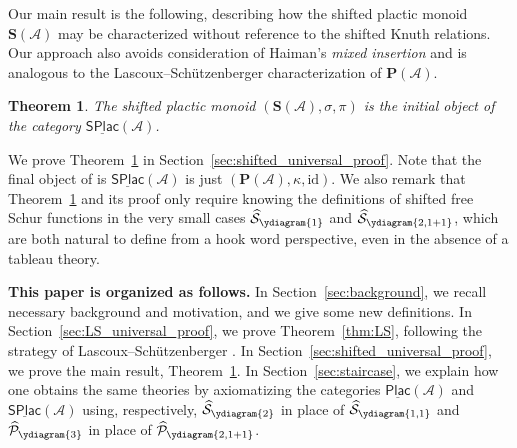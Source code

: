 \documentclass[12 pt]{amsart}
\newcommand{\Plactic}{{\mathbf{P}}}
\newcommand{\sPlactic}{\mathbf{S}}
\newcommand{\Category}{\underline{\mathsf{SPlac}}}
\newcommand{\LSCategory}{\underline{\mathsf{Plac}}}
\newcommand{\FreeSchur}{\widehat{\mathcal{S}}}
\newcommand{\sFreeSchur}{\widehat{\mathcal{P}}}
\newcommand{\cA}{\mathcal{A}}
\newcommand{\id}{\mathrm{id}}
\newtheorem{theorem}[thm]{Theorem}
\theoremstyle{remark}
\numberwithin{equation}{section}
\newcommand{\santiago}[1]{\todo[size=\tiny,color=blue!30]{#1 \\ \hfill --- Santiago}}
\begin{document}
Our main result is the following, describing how the shifted plactic monoid $\sPlactic(\cA)$ may be characterized without reference to the shifted Knuth relations. Our approach also avoids consideration of Haiman's \emph{mixed insertion} and is analogous to the Lascoux--Sch\"utzenberger characterization of $\Plactic(\cA)$. 
\begin{theorem}\label{thm:main}
The shifted plactic monoid $(\sPlactic(\cA), \sigma, \pi)$ is the initial object of the category $\Category(\cA)$.
\end{theorem}


We prove Theorem~\ref{thm:main} in Section~\ref{sec:shifted_universal_proof}.  
Note that the final object of is $\Category(\cA)$ is just $(\Plactic(\cA),\kappa, \id)$. We also remark that Theorem~\ref{thm:main} and its proof only require knowing the definitions of shifted free Schur functions in the very small cases $\FreeSchur_{\ydiagram{1}}$ and $\FreeSchur_{\ydiagram{2,1+1}}$, which are both natural to define from a hook word perspective, even in the absence of a tableau theory.

\bigskip
{\bf This paper is organized as follows.} In Section~\ref{sec:background}, we recall necessary background and motivation, and we give some new definitions. In Section~\ref{sec:LS_universal_proof}, we prove Theorem~\ref{thm:LS}, following the strategy of Lascoux--Sch\"utzenberger \cite{Lascoux.Schutzenberger:plaxique}. In Section~\ref{sec:shifted_universal_proof}, we prove the main result, Theorem~\ref{thm:main}. In Section~\ref{sec:staircase}, we explain how one obtains the same theories by axiomatizing the categories $\LSCategory(\cA)$ and $\Category(\cA)$ using, respectively,
 $\FreeSchur_{\ydiagram{2}}$ in place of $\FreeSchur_{\ydiagram{1,1}}$ and $\sFreeSchur_{\ydiagram{3}}$ in place of $\sFreeSchur_{\ydiagram{2,1+1}}$. 



\end{document}
